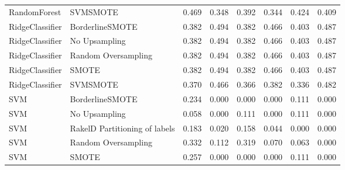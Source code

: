 \begin{tabular}{llllllll}
                   RandomForest &                      SVMSMOTE & 0.469 &                     0.348 &                 0.392 &                  0.344 &                                   0.424 &    0.409 \\
                RidgeClassifier &               BorderlineSMOTE & 0.382 &                     0.494 &                 0.382 &                  0.466 &                                   0.403 &    0.487 \\
                RidgeClassifier &                 No Upsampling & 0.382 &                     0.494 &                 0.382 &                  0.466 &                                   0.403 &    0.487 \\
                RidgeClassifier &           Random Oversampling & 0.382 &                     0.494 &                 0.382 &                  0.466 &                                   0.403 &    0.487 \\
                RidgeClassifier &                         SMOTE & 0.382 &                     0.494 &                 0.382 &                  0.466 &                                   0.403 &    0.487 \\
                RidgeClassifier &                      SVMSMOTE & 0.370 &                     0.466 &                 0.366 &                  0.382 &                                   0.336 &    0.482 \\
                            SVM &               BorderlineSMOTE & 0.234 &                     0.000 &                 0.000 &                  0.000 &                                   0.111 &    0.000 \\
                            SVM &                 No Upsampling & 0.058 &                     0.000 &                 0.111 &                  0.000 &                                   0.111 &    0.000 \\
                            SVM & RakelD Partitioning of labels & 0.183 &                     0.020 &                 0.158 &                  0.044 &                                   0.000 &    0.000 \\
                            SVM &           Random Oversampling & 0.332 &                     0.112 &                 0.319 &                  0.070 &                                   0.063 &    0.000 \\
                            SVM &                         SMOTE & 0.257 &                     0.000 &                 0.000 &                  0.000 &                                   0.111 &    0.000 \\

\end{tabular}
